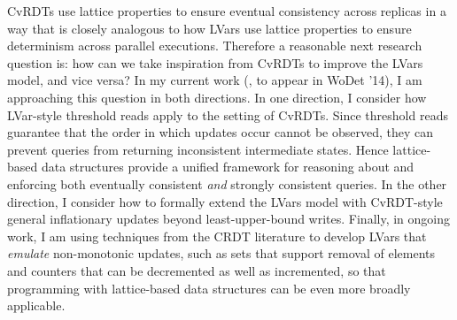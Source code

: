 \documentclass{article}
\begin{document}
CvRDTs use lattice properties to ensure eventual consistency across
replicas in a way that is closely analogous to how LVars use lattice
properties to ensure determinism across parallel executions.
Therefore a reasonable next research question is: how can we take
inspiration from CvRDTs to improve the LVars model, and vice versa?
In my current work (\cite{joining-wodet}, to appear in WoDet '14), I
am approaching this question in both directions.  In one direction, I
consider how LVar-style threshold reads apply to the setting of
CvRDTs.  Since threshold reads guarantee that the order in which
updates occur cannot be observed, they can prevent queries from
returning inconsistent intermediate states.  Hence lattice-based data
structures provide a unified framework for reasoning about and
enforcing both eventually consistent \emph{and} strongly consistent
queries.  In the other direction, I consider how to formally extend
the LVars model with CvRDT-style general inflationary updates beyond
least-upper-bound writes.  Finally, in ongoing work, I am using
techniques from the CRDT literature \cite{crdts-tr} to develop LVars
that \emph{emulate} non-monotonic updates, such as sets that support
removal of elements and counters that can be decremented as well as
incremented, so that programming with lattice-based data structures
can be even more broadly applicable.


\newcommand{\myname}[0]{\textbf{Lindsey Kuper}}

\end{document}
